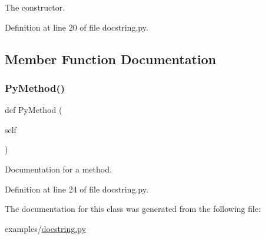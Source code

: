 \begin{DoxyVerb}The constructor.\end{DoxyVerb}
 

Definition at line 20 of file docstring.\+py.



\subsection{Member Function Documentation}
\mbox{\label{classdocstring_1_1_py_class_a06331a3bf023b9e7a180422e737b0381}} 
\subsubsection{\texorpdfstring{Py\+Method()}{PyMethod()}}
{\footnotesize\ttfamily def Py\+Method (\begin{DoxyParamCaption}\item[{}]{self }\end{DoxyParamCaption})}

\begin{DoxyVerb}Documentation for a method.\end{DoxyVerb}
 

Definition at line 24 of file docstring.\+py.



The documentation for this class was generated from the following file\+:\begin{DoxyCompactItemize}
\item 
examples/\hyperlink{docstring_8py}{docstring.\+py}\end{DoxyCompactItemize}
